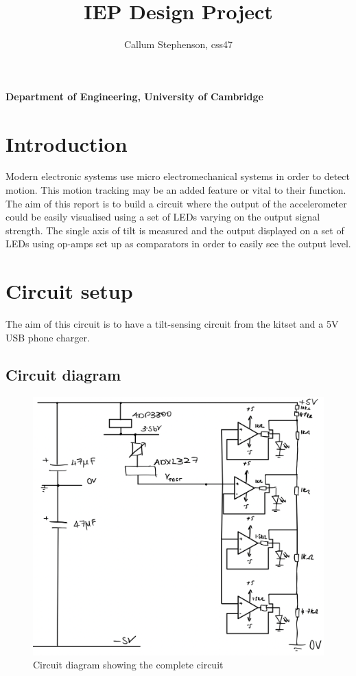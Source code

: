 \documentclass[12pt]{article}
\title{\textbf{IEP Design Project}}
\author{Callum Stephenson, css47}
\date{}
\begin{document}
    \begin{titlepage}
        \maketitle
        \thispagestyle{empty}
        \vspace{13cm}
        \textbf{Department of Engineering, University of Cambridge}
    \end{titlepage}
    \tableofcontents
    \newpage
    \section{Introduction}
        Modern electronic systems use micro electromechanical systems in order to detect motion. This motion tracking may be an added feature or vital to their function.
        The aim of this report is to build a circuit where the output of the accelerometer could be easily visualised using a set of LEDs varying on the output signal
        strength. The single axis of tilt is measured and the output displayed on a set of LEDs using op-amps set up as comparators in order to easily see the output level.
    \section{Circuit setup}
        The aim of this circuit is to have a tilt-sensing circuit from the kitset and a 5V USB phone charger.
        \subsection{Circuit diagram}
        \begin{figure}[H]
            \captionsetup{labelfont=bf}
            \includegraphics[width=30pc]{circuit_diagram.png}
            \caption{Circuit diagram showing the complete circuit}\label{figure1}
        \end{figure}
\end{document}
